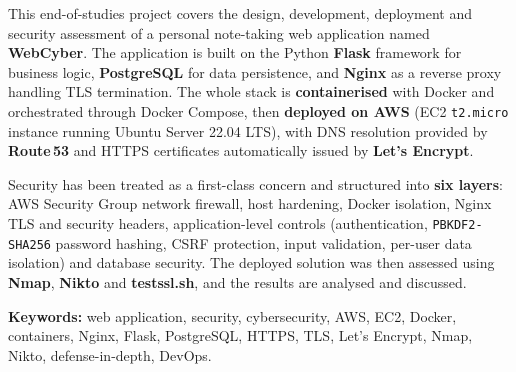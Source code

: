 This end-of-studies project covers the design, development, deployment
and security assessment of a personal note-taking web application named
\textbf{WebCyber}. The application is built on the Python
\textbf{Flask} framework for business logic, \textbf{PostgreSQL} for
data persistence, and \textbf{Nginx} as a reverse proxy handling TLS
termination. The whole stack is \textbf{containerised} with Docker and
orchestrated through Docker Compose, then \textbf{deployed on AWS}
(EC2 \texttt{t2.micro} instance running Ubuntu Server 22.04 LTS), with
DNS resolution provided by \textbf{Route\,53} and HTTPS certificates
automatically issued by \textbf{Let's Encrypt}.

\vspace{0.4em}

Security has been treated as a first-class concern and structured into
\textbf{six layers}: AWS Security Group network firewall, host
hardening, Docker isolation, Nginx TLS and security headers,
application-level controls (authentication, \texttt{PBKDF2-SHA256}
password hashing, CSRF protection, input validation, per-user data
isolation) and database security. The deployed solution was then
assessed using \textbf{Nmap}, \textbf{Nikto} and \textbf{testssl.sh},
and the results are analysed and discussed.

\vspace{0.4em}

\textbf{Keywords:} web application, security, cybersecurity, AWS, EC2,
Docker, containers, Nginx, Flask, PostgreSQL, HTTPS, TLS, Let's Encrypt,
Nmap, Nikto, defense-in-depth, DevOps.
